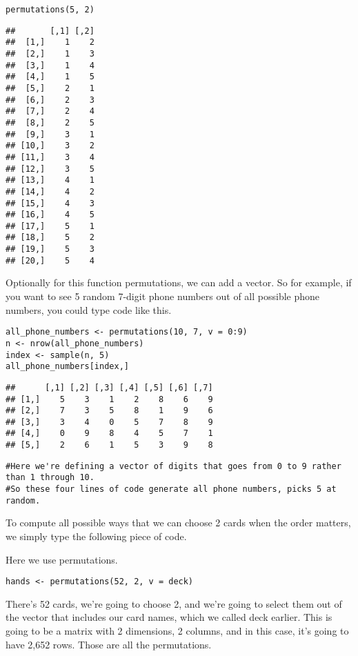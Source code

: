 \documentclass[
]{article}
\begin{document}
\begin{verbatim}
permutations(5, 2)
\end{verbatim}

\begin{verbatim}
##       [,1] [,2]
##  [1,]    1    2
##  [2,]    1    3
##  [3,]    1    4
##  [4,]    1    5
##  [5,]    2    1
##  [6,]    2    3
##  [7,]    2    4
##  [8,]    2    5
##  [9,]    3    1
## [10,]    3    2
## [11,]    3    4
## [12,]    3    5
## [13,]    4    1
## [14,]    4    2
## [15,]    4    3
## [16,]    4    5
## [17,]    5    1
## [18,]    5    2
## [19,]    5    3
## [20,]    5    4
\end{verbatim}

Optionally for this function permutations, we can add a vector. So for
example, if you want to see 5 random 7-digit phone numbers out of all
possible phone numbers, you could type code like this.

\begin{verbatim}
all_phone_numbers <- permutations(10, 7, v = 0:9)
n <- nrow(all_phone_numbers)
index <- sample(n, 5)
all_phone_numbers[index,]
\end{verbatim}

\begin{verbatim}
##      [,1] [,2] [,3] [,4] [,5] [,6] [,7]
## [1,]    5    3    1    2    8    6    9
## [2,]    7    3    5    8    1    9    6
## [3,]    3    4    0    5    7    8    9
## [4,]    0    9    8    4    5    7    1
## [5,]    2    6    1    5    3    9    8
\end{verbatim}

\begin{verbatim}
#Here we're defining a vector of digits that goes from 0 to 9 rather than 1 through 10.
#So these four lines of code generate all phone numbers, picks 5 at random.
\end{verbatim}

To compute all possible ways that we can choose 2 cards when the order
matters, we simply type the following piece of code.

Here we use permutations.

\begin{verbatim}
hands <- permutations(52, 2, v = deck)
\end{verbatim}

There's 52 cards, we're going to choose 2, and we're going to select
them out of the vector that includes our card names, which we called
deck earlier. This is going to be a matrix with 2 dimensions, 2 columns,
and in this case, it's going to have 2,652 rows. Those are all the
permutations.
\end{document}
